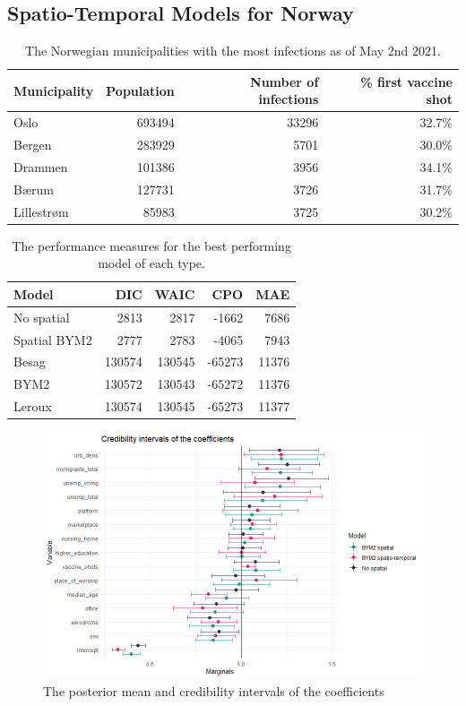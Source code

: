 \subsection{Spatio-Temporal Models for Norway}
\begin{table}[H] 
\caption{The Norwegian municipalities with the most infections as of May 2nd 2021. \label{top5norway_temporal}}
\begin{tabular}{l r r r}
\toprule
\textbf{Municipality}	& \textbf{Population}	& \textbf{Number of infections} &\textbf{\% first vaccine shot} \\
\midrule
Oslo & 693494 & 33296 & 32.7\%\\
Bergen & 283929 & 5701 & 30.0\%\\
Drammen & 101386 & 3956 & 34.1\%\\
Bærum & 127731 & 3726 & 31.7\%\\
Lillestrøm & 85983 & 3725 & 30.2\%\\
\bottomrule
\end{tabular}
\end{table}
\begin{table}[H] 
\caption{The performance measures for the best performing model of each type. \label{allNorway_temporal}}
\begin{tabular}{l r r r r}
\toprule
\textbf{Model}	& \textbf{DIC}	& \textbf{WAIC} & \textbf{CPO} & \textbf{MAE} \\
\midrule
No spatial & 2813 & 2817 & -1662 & 7686 \\
Spatial BYM2 & 2777 & 2783 & -4065 & 7943\\
Besag & 130574 & 130545 & -65273 & 11376 \\
BYM2 & 130572 & 130543 & -65272 & 11376\\
Leroux & 130574 & 130545 & -65273 & 11377\\
\bottomrule
\end{tabular}
\end{table}
\begin{figure}[H]
  \centering
  \includegraphics[width = \textwidth]{intervals_norway_temporal.png}
  \caption{The posterior mean and credibility intervals of the coefficients}
  \label{intervalNorway_temporal}
\end{figure}
